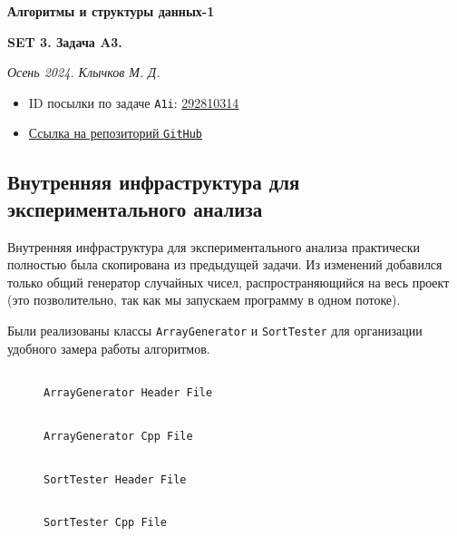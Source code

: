 \documentclass[11pt,a4paper]{scrarticle}
\author{Клычков Максим Дмитриевич}
\theoremstyle{definition}
\begin{document}
\centerline{\textbf{\huge Алгоритмы и структуры данных-1}}
\centerline{\textbf{SET 3. Задача A3.}}
\begin{flushright}
	\emph{Осень 2024. Клычков М. Д.}
\end{flushright}

\begin{itemize}
	\item ID посылки по задаче \texttt{A1i}: \href{https://dsahse.contest.codeforces.com/group/NOflOR1Qt0/contest/565612/submission/292810314}{292810314}
	\item \href{https://github.com/maklybae/algorithms/tree/main/set03/a3}{Ссылка на репозиторий \texttt{GitHub}}
\end{itemize}

\subsection*{Внутренняя инфраструктура для экспериментального анализа}

Внутренняя инфраструктура для экспериментального анализа практически полностью была скопирована из предыдущей задачи. Из изменений добавился только общий генератор случайных чисел, распространяющийся на весь проект (это позволительно, так как мы запускаем программу в одном потоке).

Были реализованы классы \texttt{ArrayGenerator} и \texttt{SortTester} для организации удобного замера работы алгоритмов.

\begin{figure}[htp]
	\centering
	\inputminted[linenos,fontsize=\small]{cpp}{../analyze/generator.h}
	\caption{\texttt{ArrayGenerator Header File}}
	\label{code:generator-h}
\end{figure}
\FloatBarrier

\begin{figure}[htp]
	\centering
	\inputminted[linenos,fontsize=\small]{cpp}{../analyze/generator.cpp}
	\caption{\texttt{ArrayGenerator Cpp File}}
	\label{code:generator-cpp}
\end{figure}
\FloatBarrier

\begin{figure}[htp]
	\centering
	\inputminted[linenos,fontsize=\small]{cpp}{../analyze/tester.h}
	\caption{\texttt{SortTester Header File}}
	\label{code:tester-h}
\end{figure}
\FloatBarrier

\begin{figure}[htp]
	\centering
	\inputminted[linenos,fontsize=\small]{cpp}{../analyze/tester.cpp}
	\caption{\texttt{SortTester Cpp File}}
	\label{code:tester-cpp}
\end{figure}
\FloatBarrier
\end{document}

